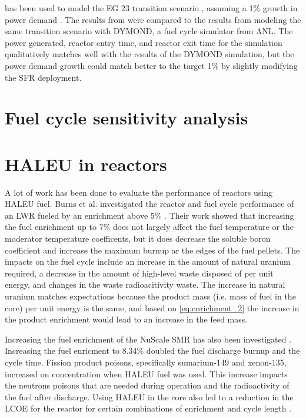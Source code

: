 \Cyclus has been used to model the EG 23 transition scenario 
\cite{wigeland_nuclear_2014}, assuming a 1\% growth in power demand 
\cite{djokic_application_2015}. The results from \Cyclus were compared 
to the results from modeling the same transition scenario with DYMOND, 
a fuel cycle simulator from \gls{ANL}. The power generated, reactor entry 
time, and reactor exit time for the \Cyclus simulation qualitatively 
matches well with the results of the DYMOND simulation, but the power 
demand growth could match better to the target 1\% by slightly modifying 
the \gls{SFR} deployment. 

\section{Fuel cycle sensitivity analysis}

\section{HALEU in reactors}
A lot of work has been done to evaluate the performance of reactors 
using \gls{HALEU} fuel. Burns et al. investigated the reactor and fuel cycle 
performance of an \gls{LWR} fueled by an enrichment above 5\% \cite{burns_reactor_2020}.
Their work showed that increasing the fuel enrichment up to 7\% does not 
largely affect the fuel temperature or the moderator temperature coefficents,
but it does decrease the soluble boron coefficient and increase the maximum 
burnup ar the edges of the fuel pellets. The impacts on the fuel cycle include 
an increase in the amount of natural uranium required, a decrease in the 
amount of high-level waste disposed of per unit energy, and changes in the 
waste radioacitivity waste. The increase in natural uranium matches 
expectations
because the product mass (i.e. mass of fuel in the core) per unit 
energy is the same, and 
based on \ref{eq:enrichment_2} the increase in the product enrichment would 
lead to an increase in the feed mass. 

Increasing the fuel enrichment of the NuScale \gls{SMR} has also been investigated 
\cite{carlson_implications_2022}. Increasing the fuel enricment to 8.34\% doubled the 
fuel discharge burnup and the cycle time. Fission product poisons, specifically 
sumarium-149 and xenon-135, increased on concentration when \gls{HALEU} fuel was used. 
This increase impacts the neutrons poisons that are needed during operation and the 
radioactivity of the fuel after discharge. Using \gls{HALEU} in the core also led 
to a reduction in the \gls{LCOE} for the reactor for certain combinations of 
enrichment and cycle length \cite{carlson_economic_2020,carlson_implications_2022}.

